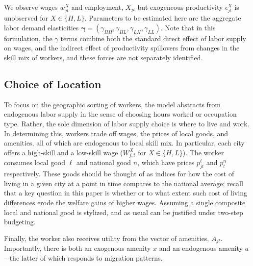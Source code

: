 \documentclass{article}
\begin{document}
We observe wages $w_{jt}^X$ and employment, $X_{jt}$ but exogeneous productivity $\epsilon_{jt}^X$ is unobserved for $X \in \{H, L\}$. Parameters to be estimated here are the aggregate labor demand elasticities $\bm{\gamma} = (\gamma_{HH}, \gamma_{HL}, \gamma_{LH}, \gamma_{LL})$. Note that in this formulation,  the $\gamma$ terms combine both the standard direct effect of labor supply on wages, and the indirect effect of productivity spillovers from changes in the skill mix of workers, and these forces are not separately identified. 

\subsection{Choice of Location}


To focus on the geographic sorting of workers, the model abstracts from endogenous labor supply in the sense of choosing hours worked or occupation type. Rather, the sole dimension of labor supply choice is where to live and work. In determining this, workers trade off wages, the prices of local goods, and amenities, all of which are endogenous to local skill mix. In particular, each city offers a high-skill and a low-skill wage ($W_{j,t}^X$ for $X \in \{H, L\}$). The worker consumes local good $\ell$ and national good $n$, which have prices $p^\ell_{jt}$ and $p^n_t$ respectively. These goods should be thought of as indices for how the cost of living in a given city at a point in time compares to the national average; recall that a key question in this paper is whether or to what extent such cost of living differences erode the welfare gains of higher wages. Assuming a single composite local and national good is stylized, and as usual can be justified under two-step budgeting.

Finally, the worker also receives utility from the vector of amenities, $A_{jt}$. Importantly, there is both an exogenous amenity $x$ and an endogenous amenity $a$ -- the latter of which responds to migration patterns. 
\end{document}
